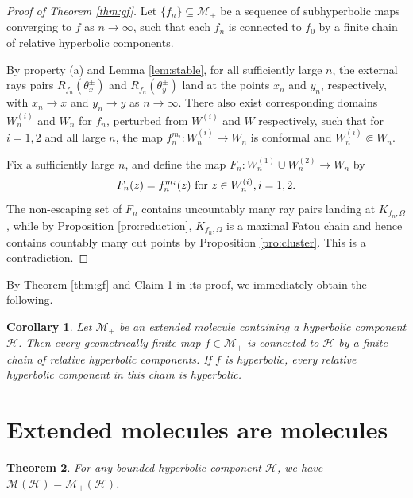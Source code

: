 \documentclass[a4paper,reqno,times, 11pt]{amsart}
\newtheorem{theorem}{Theorem}[section]
\newtheorem{corollary}[theorem]{Corollary}
\theoremstyle{remark}
\theoremstyle{plain}
\numberwithin{equation}{section}
\def\MMMM{{\cal M}}
\def\MMMM{\mathscr M}
\def\HHHH{\mathscr H}
\def\cal{\mathcal}
\begin{document}
\begin{proof}[Proof of Theorem \ref{thm:gf}]
	Let $\{f_n\}\subseteq\MMMM_+$ be a sequence of subhyperbolic maps converging to $f$ as $n\to\infty$, such that each $f_n$ is connected to $f_0$ by a finite chain of relative hyperbolic components.
	
	By property (a) and Lemma \ref{lem:stable}, for all sufficiently large $n$, the external rays pairs $R_{f_n}(\theta_x^{\pm})$ and $R_{f_n}(\theta_y^{\pm})$ land at the  points $x_n$ and $y_n$, respectively, with $x_n\to x$ and $y_n\to y$ as $n\to\infty$. There also exist corresponding domains $W_{n}^{(i)}$ and $W_n$ for $f_n$,  perturbed from $W^{(i)}$ and $W$ respectively, such that for $i=1,2$ and all large $n$,  the map  $f^{m_i}_n: W_{n}^{(i)}\to W_n$ is conformal
	and  $W_n^{(i)}\Subset W_n$.
	
	Fix a sufficiently large $n$, and define the map $F_n:W_{n}^{(1)}\cup W_{n}^{(2)}\to W_n$ by $$F_n(z)=f^{m_i}_n(z)\textup{ for }z\in W_{n}^{(i)}, i=1,2.$$ The non-escaping set of $F_n$ contains uncountably many ray pairs landing at $K_{f_n,\Omega}$, while by Proposition \ref{pro:reduction}, $K_{f_n,\Omega}$ is a maximal Fatou chain and hence contains countably many cut points by Proposition \ref{pro:cluster}. This is a contradiction.
\end{proof}

By Theorem \ref{thm:gf} and Claim 1 in its proof, we immediately obtain the following.

\begin{corollary}\label{coro:finite-step}
	Let $\MMMM_+$ be an extended molecule containing a hyperbolic component $\HHHH$. Then every geometrically finite map  $f\in\MMMM_+$ is connected to $\HHHH$ by a finite chain of relative hyperbolic components. If $f$ is hyperbolic, every relative hyperbolic component in this chain is hyperbolic.
\end{corollary}



\section{Extended molecules are molecules}\label{sec:A}



\begin{theorem}\label{thm:same}
	For any bounded hyperbolic component $\HHHH$, we have $\MMMM(\HHHH)=\MMMM_+(\HHHH)$.
\end{theorem}
\end{document}
